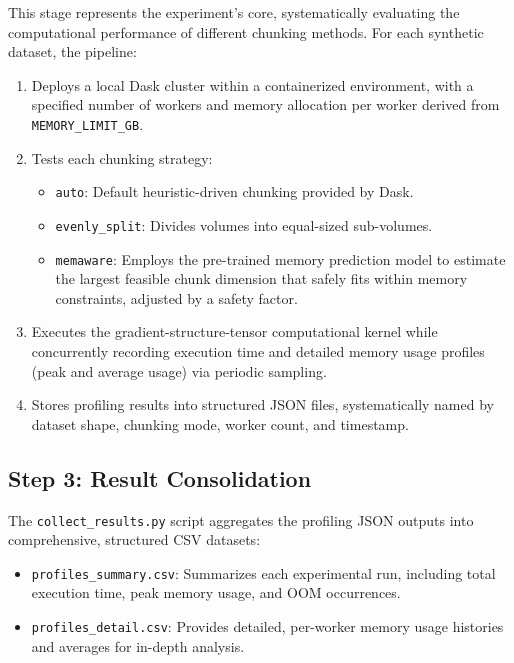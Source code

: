 This stage represents the experiment's core, systematically evaluating the computational performance of different chunking methods.
For each synthetic dataset, the pipeline:

\begin{enumerate}
    \item Deploys a local Dask cluster within a containerized environment, with a specified number of workers and memory allocation per worker derived from \texttt{MEMORY\_LIMIT\_GB}.
    \item Tests each chunking strategy:\begin{itemize}
                                           \item \texttt{auto}: Default heuristic-driven chunking provided by Dask.
                                           \item \texttt{evenly\_split}: Divides volumes into equal-sized sub-volumes.
                                           \item \texttt{memaware}: Employs the pre-trained memory prediction model to estimate the largest feasible chunk dimension that safely fits within memory constraints, adjusted by a safety factor.
    \end{itemize}
    \item Executes the gradient-structure-tensor computational kernel while concurrently recording execution time and detailed memory usage profiles (peak and average usage) via periodic sampling.
    \item Stores profiling results into structured JSON files, systematically named by dataset shape, chunking mode, worker count, and timestamp.
\end{enumerate}

\subsection*{Step 3: Result Consolidation}

The \texttt{collect\_results.py} script aggregates the profiling JSON outputs into comprehensive, structured CSV datasets:

\begin{itemize}
    \item \texttt{profiles\_summary.csv}: Summarizes each experimental run, including total execution time, peak memory usage, and \ac{OOM} occurrences.
    \item \texttt{profiles\_detail.csv}: Provides detailed, per-worker memory usage histories and averages for in-depth analysis.
\end{itemize}

